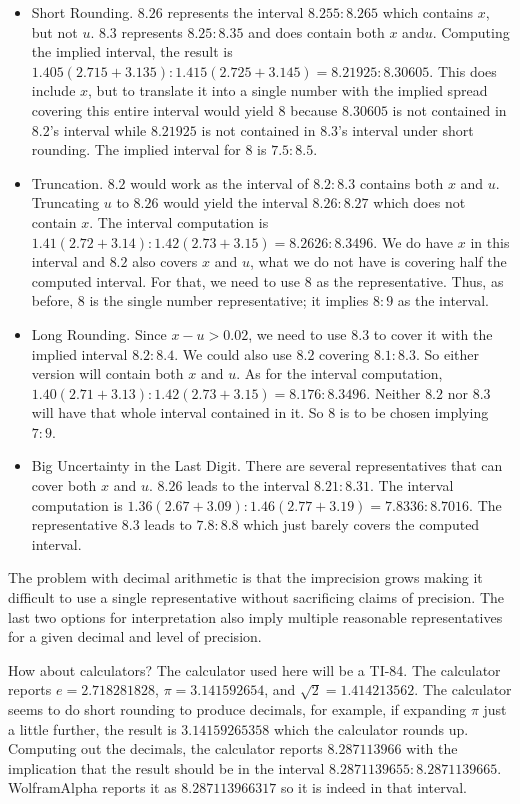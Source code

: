 \documentclass[12pt]{article}
\begin{document}
\begin{itemize}
    \item Short Rounding. $8.26$ represents the interval $8.255:8.265$ which contains $x$, but not $u$. $8.3$ represents $8.25:8.35$ and does contain both $x$ and$u$. Computing the implied interval, the result is $1.405(2.715 + 3.135):1.415(2.725 + 3.145)  = 8.21925:8.30605$. This does include $x$, but to translate it into a single number with the implied spread covering this entire interval would yield $8$ because $8.30605$ is not contained in $8.2$'s interval while $8.21925$ is not contained in $8.3$'s interval under short rounding. The implied interval for $8$ is $7.5:8.5$.
    \item Truncation. $8.2$ would work as the interval of $8.2:8.3$ contains both $x$ and $u$. Truncating $u$ to $8.26$ would yield the interval $8.26:8.27$ which does not contain $x$. The interval computation is $1.41(2.72+3.14):1.42(2.73+3.15)  = 8.2626:8.3496$. We do have $x$ in this interval and $8.2$ also covers $x$ and $u$, what we do not have is covering half the computed interval. For that, we need to use $8$ as the representative. Thus, as before, $8$ is the single number representative; it implies $8:9$ as the interval. 
    \item Long Rounding. Since $x-u > 0.02$, we need to use $8.3$ to cover it with the implied interval $8.2:8.4$. We could also use $8.2$ covering $8.1:8.3$. So either version will contain both $x$ and $u$. As for the interval computation, $1.40(2.71+3.13): 1.42(2.73+3.15) = 8.176: 8.3496$. Neither $8.2$ nor $8.3$ will have that whole interval contained in it. So $8$ is to be chosen implying $7:9$. 
    \item Big Uncertainty in the Last Digit. There are several representatives that can cover both $x$ and $u$. $8.26$ leads to the interval $8.21:8.31$. The interval computation is $1.36(2.67+3.09): 1.46(2.77+3.19) = 7.8336:8.7016$. The representative $8.3$ leads to $7.8:8.8$ which just barely covers the computed interval.  
\end{itemize}

The problem with decimal arithmetic is that the imprecision grows making it difficult to use a single representative without sacrificing claims of precision. The last two options for interpretation also imply multiple reasonable representatives for a given decimal and level of precision. 

How about calculators? The calculator used here will be a TI-84. The calculator reports  $e = 2.718281828$, $\pi = 3.141592654$, and $\sqrt{2} = 1.414213562$. The calculator seems to do short rounding to produce decimals, for example, if expanding $\pi $ just a little further, the result is  $3.14159265358$ which the calculator rounds up. Computing out the decimals, the calculator reports $8.287113966$ with the implication that the result should be in the interval $8.2871139655:8.2871139665$.  WolframAlpha reports it as $8.287113966317$ so it is indeed in that interval. 
\end{document}
